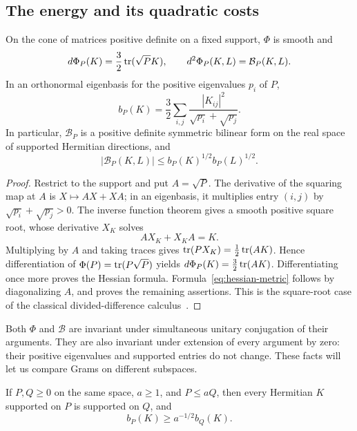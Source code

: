 \subsection{The energy and its quadratic costs}

\begin{lemma}\label{lem:hessian}
On the cone of matrices positive definite on a fixed support,
$\Phi$ is smooth and
\[
 d\Phi_P(K)=\frac32\operatorname{tr}(\sqrt P K),\qquad
 d^2\Phi_P(K,L)=\mathcal B_P(K,L).
\]
In an orthonormal eigenbasis for the positive eigenvalues $p_i$ of
$P$,
\begin{equation}\label{eq:hessian-metric}
 b_P(K)=\frac32\sum_{i,j}
 \frac{|K_{ij}|^2}{\sqrt{p_i}+\sqrt{p_j}}.
\end{equation}
In particular, $\mathcal B_P$ is a positive definite symmetric
bilinear form on the real space of supported Hermitian directions,
and
\[
 |\mathcal B_P(K,L)|\le b_P(K)^{1/2}b_P(L)^{1/2}.
\]
\end{lemma}

\begin{proof}
Restrict to the support and put $A=\sqrt P$.  The derivative of the
squaring map at $A$ is $X\mapsto AX+XA$; in an eigenbasis, it
multiplies entry $(i,j)$ by $\sqrt{p_i}+\sqrt{p_j}>0$.
The inverse function theorem gives a smooth positive square root,
whose derivative $X_K$ solves
\[
 AX_K+X_KA=K.
\]
Multiplying by $A$ and taking traces gives
$\operatorname{tr}(PX_K)=\tfrac12\operatorname{tr}(AK)$.  Hence differentiation of
$\Phi(P)=\operatorname{tr}(P\sqrt P)$ yields
$d\Phi_P(K)=\tfrac32\operatorname{tr}(AK)$.  Differentiating once more proves
the Hessian formula.  Formula~\eqref{eq:hessian-metric} follows by
diagonalizing $A$, and proves the remaining assertions.
This is the square-root case of the classical divided-difference
calculus~\cite[Section~1]{Daletskii1957}.
\end{proof}

Both $\Phi$ and $\mathcal B$ are invariant under simultaneous unitary
conjugation of their arguments.  They are also invariant under
extension of every argument by zero: their positive eigenvalues and
supported entries do not change.  These facts will let us compare
Grams on different subspaces.

\begin{lemma}\label{lem:order}
If $P,Q\ge0$ on the same space, $a\ge1$, and $P\le aQ$, then every
Hermitian $K$ supported on $P$ is supported on $Q$, and
\begin{equation}\label{eq:matrix-order}
 b_P(K)\ge a^{-1/2}b_Q(K).
\end{equation}
\end{lemma}

